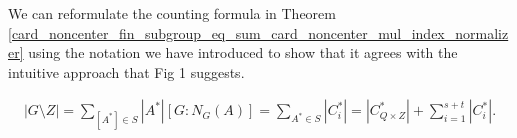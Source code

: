 




We can reformulate the counting formula in Theorem \ref{card_noncenter_fin_subgroup_eq_sum_card_noncenter_mul_index_normalizer} using the notation we have introduced to show that it agrees with the intuitive approach that Fig 1 suggests.

\begin{align*} 
  |G \! \setminus \! Z| = \sum_{[A^*] \in S} |A^*| [G:N_G(A)] = \sum_{A^* \in S} |C_i^*| = |C_{Q \times Z}^*| + \sum_{i=1}^{s+t} |C_i^*|.
\end{align*}

